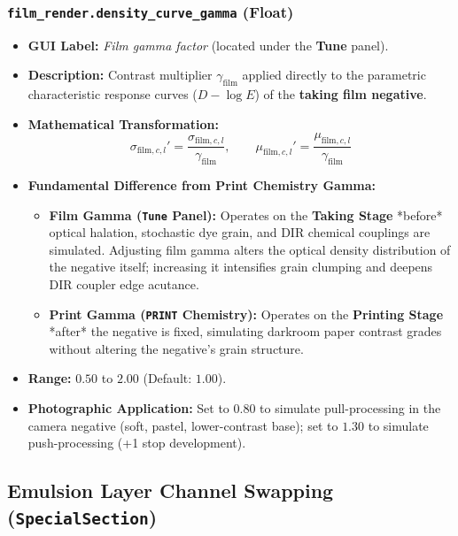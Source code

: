 \documentclass[11pt,a4paper]{article}
\begin{document}
\subsubsection{\texttt{film\_render.density\_curve\_gamma} (Float)}
\begin{itemize}[leftmargin=*]
    \item \textbf{GUI Label:} \textit{Film gamma factor} (located under the \textbf{Tune} panel).
    \item \textbf{Description:} Contrast multiplier $\gamma_{\text{film}}$ applied directly to the parametric characteristic response curves ($D-\log E$) of the \textbf{taking film negative}.
    \item \textbf{Mathematical Transformation:}
    \begin{equation}
    \sigma_{\text{film}, c, l}' = \frac{\sigma_{\text{film}, c, l}}{\gamma_{\text{film}}}, \qquad \mu_{\text{film}, c, l}' = \frac{\mu_{\text{film}, c, l}}{\gamma_{\text{film}}}
    \end{equation}
    \item \textbf{Fundamental Difference from Print Chemistry Gamma:}
    \begin{itemize}
        \item \textbf{Film Gamma (\texttt{Tune} Panel):} Operates on the \textbf{Taking Stage} *before* optical halation, stochastic dye grain, and DIR chemical couplings are simulated. Adjusting film gamma alters the optical density distribution of the negative itself; increasing it intensifies grain clumping and deepens DIR coupler edge acutance.
        \item \textbf{Print Gamma (\texttt{PRINT} Chemistry):} Operates on the \textbf{Printing Stage} *after* the negative is fixed, simulating darkroom paper contrast grades without altering the negative's grain structure.
    \end{itemize}
    \item \textbf{Range:} $0.50$ to $2.00$ (Default: $1.00$).
    \item \textbf{Photographic Application:} Set to $0.80$ to simulate pull-processing in the camera negative (soft, pastel, lower-contrast base); set to $1.30$ to simulate push-processing (+1 stop development).
\end{itemize}

\subsection{Emulsion Layer Channel Swapping (\texttt{SpecialSection})}
\end{document}
